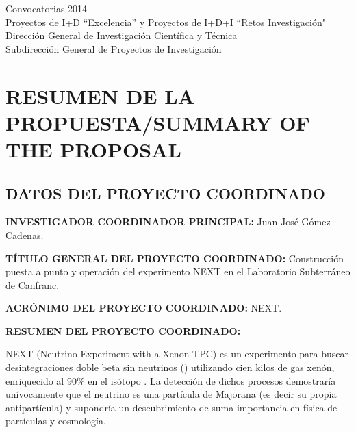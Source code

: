 \documentclass[a4paper,11pt,oneside]{article}
\begin{document}


\begin{center}
{\Large \textsf{Convocatorias 2014}} \\ \vspace{0.3cm}
{\Large  \textsf{Proyectos de I+D ``Excelencia'' y Proyectos de I+D+I ``Retos Investigación"}} \\ 
{\Large \textsf{Dirección General de Investigación Científica y Técnica}} \\
{\Large \textsf{Subdirección General de Proyectos de Investigación }} \\ 
\end{center}


\section{\bf \textsf{RESUMEN DE LA PROPUESTA/SUMMARY OF THE PROPOSAL}}
\subsection{DATOS DEL PROYECTO COORDINADO}

{\bf INVESTIGADOR COORDINADOR PRINCIPAL:} Juan José Gómez Cadenas.
\vspace{0.3cm}

{\bf TÍTULO GENERAL DEL PROYECTO COORDINADO:} Construcción puesta a punto y operación del experimento NEXT en el Laboratorio Subterráneo de Canfranc.
\vspace{0.3cm}

{\bf ACRÓNIMO DEL PROYECTO COORDINADO:} NEXT.
\vspace{0.3cm}

{\bf RESUMEN DEL PROYECTO COORDINADO:} 

NEXT (Neutrino Experiment with a Xenon TPC) es un experimento para buscar desintegraciones doble beta sin neutrinos (\bbonu) utilizando cien kilos de gas xenón, enriquecido al 90\% en el isótopo \XE. La detección de dichos procesos demostraría unívocamente que el neutrino es una partícula de Majorana (es decir su propia antipartícula) y supondría un descubrimiento de suma importancia en física de partículas y cosmología. 
\end{document}

